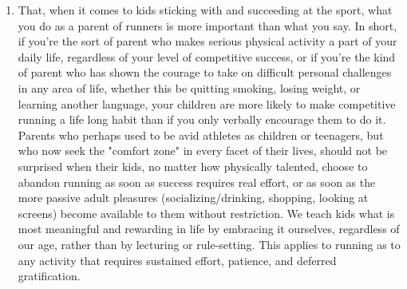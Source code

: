 \begin{enumerate}
    \item That, when it comes to kids sticking with and succeeding at the sport, what you do as a parent of runners is more important than what you say. In short, if you're the sort of parent who makes serious physical activity a part of your daily life, regardless of your level of competitive success, or if you're the kind of parent who has shown the courage to take on difficult personal challenges in any area of life, whether this be quitting smoking, losing weight, or learning another language, your children are more likely to make competitive running a life long habit than if you only verbally encourage them to do it. Parents who perhaps used to be avid athletes as children or teenagers, but who now seek the "comfort zone" in every facet of their lives, should not be surprised when their kids, no matter how physically talented, choose to abandon running as soon as success requires real effort, or as soon as the more passive adult pleasures (socializing/drinking, shopping, looking at screens) become available to them without restriction. We teach kids what is most meaningful and rewarding in life by embracing it ourselves, regardless of our age, rather than by lecturing or rule-setting. This applies to running as to any activity that requires sustained effort, patience, and deferred gratification.
\end{enumerate}




